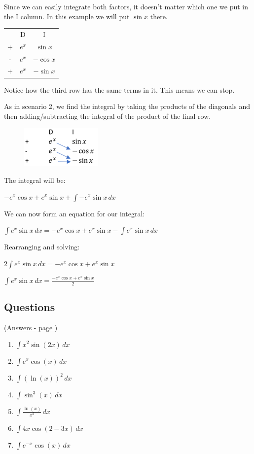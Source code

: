 \documentclass[../main.tex]{subfiles}
\begin{document}
Since we can easily integrate both factors, it doesn’t matter which one we put in the I column. In this example we will put \(\sin{x}\) there.

\begin{tabular}{ c c c }
   & D & I \\ 
 +  & $e^x$ &$\sin{x}$ \\  
 - & $e^x$ & $-\cos{x}$\\
  + & $e^x$ & $-\sin{x}$ \\  
\end{tabular}

Notice how the third row has the same terms in it. This means we can stop.

As in scenario 2, we find the integral by taking the products of the diagonals and then adding/subtracting the integral of the product of the final row.

\begin{figure}[h]
    \includegraphics{images/dimethod3.png}
\end{figure}

The integral will be:

\(-e^x\cos{x}+e^x\sin{x}+\int -e^x\sin{x}\,dx\)

We can now form an equation for our integral:

\(\int e^x \sin{x}\,dx=-e^x\cos{x}+e^x\sin{x}-\int e^x\sin{x}\,dx\)

Rearranging and solving:

\(2\int e^x \sin{x}\,dx=-e^x\cos{x}+e^x\sin{x}\)

\(\int e^x \sin{x}\, dx=\frac{-e^x\cos{x}+e^x\sin{x}}{2}\)

\pagebreak
\hypertarget{dimethodlink}{\subsection*{Questions}}
\hyperlink{dimethodanswers}{(Answers - page {\pageref*{DI method answers}})}

\label{DI Method}
\begin{enumerate}
    \item \(\int x^2\sin{(2x)}\, dx\)

    \item \(\int e^x \cos{(x)}\, dx\)

    \item \(\int (\ln{(x)})^2\, dx\)

    \item \(\int \sin^3{(x)}\,dx\)

    \item \(\int \frac{\ln{(x)}}{x^2}\, dx\)

    \item \(\int 4x\cos{(2-3x)}\, dx\)

    \item \(\int e^{-x}\cos{(x)}\, dx\)

    
\end{enumerate}


\pagebreak
\end{document}
